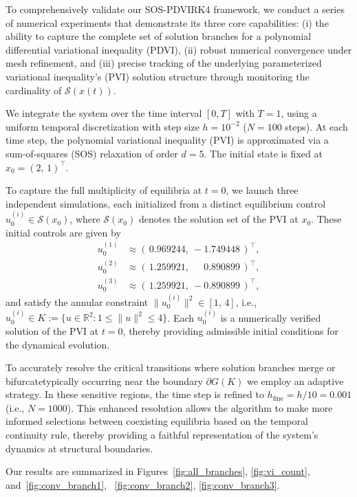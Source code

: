 \documentclass[sn-basic,Numbered]{sn-jnl}
\theoremstyle{thmstyleone}%
\begin{document}
To comprehensively validate our SOS-PDVIRK4 framework, we conduct a series of numerical experiments that demonstrate its three core capabilities: (i) the ability to capture the complete set of solution branches for a polynomial differential variational inequality (PDVI), (ii) robust numerical convergence under mesh refinement, and (iii) precise tracking of the underlying parameterized variational inequality's (PVI) solution structure through monitoring the cardinality of $\mathcal{S}(x(t))$.


We integrate the system over the time interval $[0, T]$ with $T = 1$, using a uniform temporal discretization with step size $h = 10^{-2}$ ($N = 100$ steps). At each time step, the polynomial variational inequality (PVI) is approximated via a sum-of-squares (SOS) relaxation of order $d = 5$. The initial state is fixed at $x_0 = (2,\,1)^\top$.

To capture the full multiplicity of equilibria at $t=0$, we launch three independent simulations, each initialized from a distinct equilibrium control $u_0^{(i)} \in \mathcal{S}(x_0)$, where $\mathcal{S}(x_0)$ denotes the solution set of the PVI at $x_0$. These initial controls are given by
\[
\begin{aligned}
u^{(1)}_0 &\approx (\,0.969244,\ -1.749448\,)^\top, \\
u^{(2)}_0 &\approx (\,1.259921,\ \phantom{-}0.890899\,)^\top, \\
u^{(3)}_0 &\approx (\,1.259921,\ -0.890899\,)^\top,
\end{aligned}
\]
and satisfy the annular constraint $\|u^{(i)}_0\|^2 \in [1,\,4]$, i.e., $u^{(i)}_0 \in K := \{ u \in \mathbb{R}^2 : 1 \leq \|u\|^2 \leq 4 \}$. Each $u^{(i)}_0$ is a numerically verified solution of the PVI at $t = 0$, thereby providing admissible initial conditions for the dynamical evolution.


To accurately resolve the critical transitions where solution branches merge or bifurcatetypically occurring near the boundary $\partial G(K)$ we employ an adaptive strategy. In these sensitive regions, the time step is refined to $h_{\text{fine}} = h/10 = 0.001$ (i.e., $N=1000$). This enhanced resolution allows the algorithm to make more informed selections between coexisting equilibria based on the temporal continuity rule, thereby providing a faithful representation of the system's dynamics at structural boundaries.

Our results are summarized in Figures~\ref{fig:all_branches}, \ref{fig:vi_count}, and~\ref{fig:conv_branch1}, ~\ref{fig:conv_branch2}, \ref{fig:conv_branch3}.
\end{document}
